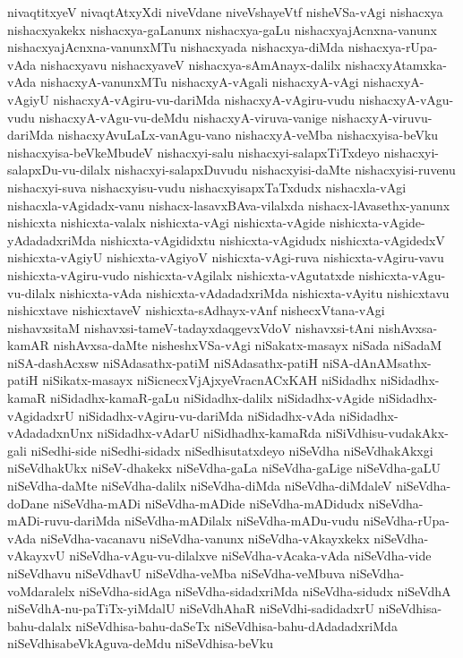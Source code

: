 {nivaqtitxyeV
nivaqtAtxyXdi
niveVdane
niveVshayeVtf
nisheVSa-vAgi
nishacxya
nishacxyakekx
nishacxya-gaLanunx
nishacxya-gaLu
nishacxyajAcnxna-vanunx
nishacxyajAcnxna-vanunxMTu
nishacxyada
nishacxya-diMda
nishacxya-rUpa-vAda
nishacxyavu
nishacxyaveV
nishacxya-sAmAnayx-dalilx
nishacxyAtamxka-vAda
nishacxyA-vanunxMTu
nishacxyA-vAgali
nishacxyA-vAgi
nishacxyA-vAgiyU
nishacxyA-vAgiru-vu-dariMda
nishacxyA-vAgiru-vudu
nishacxyA-vAgu-vudu
nishacxyA-vAgu-vu-deMdu
nishacxyA-viruva-vanige
nishacxyA-viruvu-dariMda
nishacxyAvuLaLx-vanAgu-vano
nishacxyA-veMba
nishacxyisa-beVku
nishacxyisa-beVkeMbudeV
nishacxyi-salu
nishacxyi-salapxTiTxdeyo
nishacxyi-salapxDu-vu-dilalx
nishacxyi-salapxDuvudu
nishacxyisi-daMte
nishacxyisi-ruvenu
nishacxyi-suva
nishacxyisu-vudu
nishacxyisapxTaTxdudx
nishacxla-vAgi
nishacxla-vAgidadx-vanu
nishacx-lasavxBAva-vilalxda
nishacx-lAvasethx-yanunx
nishicxta
nishicxta-valalx
nishicxta-vAgi
nishicxta-vAgide
nishicxta-vAgide-yAdadadxriMda
nishicxta-vAgididxtu
nishicxta-vAgidudx
nishicxta-vAgidedxV
nishicxta-vAgiyU
nishicxta-vAgiyoV
nishicxta-vAgi-ruva
nishicxta-vAgiru-vavu
nishicxta-vAgiru-vudo
nishicxta-vAgilalx
nishicxta-vAgutatxde
nishicxta-vAgu-vu-dilalx
nishicxta-vAda
nishicxta-vAdadadxriMda
nishicxta-vAyitu
nishicxtavu
nishicxtave
nishicxtaveV
nishicxta-sAdhayx-vAnf
nishecxVtana-vAgi
nishavxsitaM
nishavxsi-tameV-tadayxdaqgevxVdoV
nishavxsi-tAni
nishAvxsa-kamAR
nishAvxsa-daMte
nisheshxVSa-vAgi
niSakatx-masayx
niSada
niSadaM
niSA-dashAcxsw
niSAdasathx-patiM
niSAdasathx-patiH
niSA-dAnAMsathx-patiH
niSikatx-masayx
niSicnecxVjAjxyeVracnACxKAH
niSidadhx
niSidadhx-kamaR
niSidadhx-kamaR-gaLu
niSidadhx-dalilx
niSidadhx-vAgide
niSidadhx-vAgidadxrU
niSidadhx-vAgiru-vu-dariMda
niSidadhx-vAda
niSidadhx-vAdadadxnUnx
niSidadhx-vAdarU
niSidhadhx-kamaRda
niSiVdhisu-vudakAkx-gali
niSedhi-side
niSedhi-sidadx
niSedhisutatxdeyo
niSeVdha
niSeVdhakAkxgi
niSeVdhakUkx
niSeV-dhakekx
niSeVdha-gaLa
niSeVdha-gaLige
niSeVdha-gaLU
niSeVdha-daMte
niSeVdha-dalilx
niSeVdha-diMda
niSeVdha-diMdaleV
niSeVdha-doDane
niSeVdha-mADi
niSeVdha-mADide
niSeVdha-mADidudx
niSeVdha-mADi-ruvu-dariMda
niSeVdha-mADilalx
niSeVdha-mADu-vudu
niSeVdha-rUpa-vAda
niSeVdha-vacanavu
niSeVdha-vanunx
niSeVdha-vAkayxkekx
niSeVdha-vAkayxvU
niSeVdha-vAgu-vu-dilalxve
niSeVdha-vAcaka-vAda
niSeVdha-vide
niSeVdhavu
niSeVdhavU
niSeVdha-veMba
niSeVdha-veMbuva
niSeVdha-voMdaralelx
niSeVdha-sidAga
niSeVdha-sidadxriMda
niSeVdha-sidudx
niSeVdhA
niSeVdhA-nu-paTiTx-yiMdalU
niSeVdhAhaR
niSeVdhi-sadidadxrU
niSeVdhisa-bahu-dalalx
niSeVdhisa-bahu-daSeTx
niSeVdhisa-bahu-dAdadadxriMda
niSeVdhisabeVkAguva-deMdu
niSeVdhisa-beVku
}
